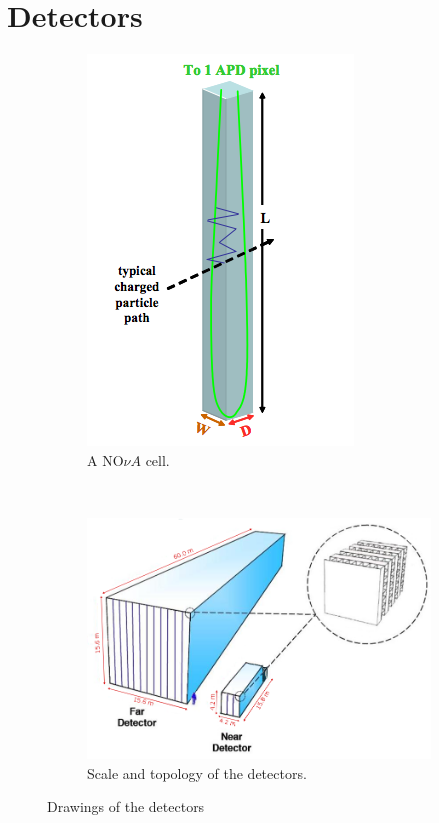 \section{\nova Detectors}
\label{sec:detectors}

\begin{figure}
\begin{subfigure}[t]{0.25\textwidth}
                \includegraphics[height=0.35\textheight]{figures/figures/cell.png}
               \caption{A NO$\nu A$ cell.}
                 \label{cell}
        \end{subfigure}
        ~
\begin{subfigure}[t]{0.75\textwidth}
                \centering
                \includegraphics[height=0.35\textheight]{figures/figures/detectors.png}
               \caption{Scale and topology of the \nova detectors.}
                \label{detector}

        \end{subfigure}
        \caption{Drawings of the \nova detectors}
\end{figure}

